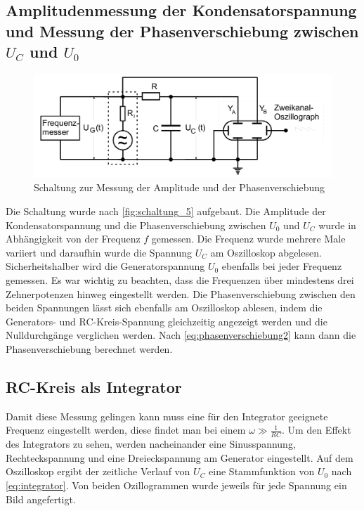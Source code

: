 \subsection{Amplitudenmessung der Kondensatorspannung und Messung der Phasenverschiebung zwischen $U_C$ und $U_0$}
\label{sec:Durchführung_2}

\begin{figure}
    \centering
    \includegraphics[width=\textwidth/2]{images/schaltung_5.png}
    \caption{Schaltung zur Messung der Amplitude und der Phasenverschiebung  \cite{V353}}
    \label{fig:schaltung_5}
\end{figure}

Die Schaltung wurde nach \autoref{fig:schaltung_5} aufgebaut. 
Die Amplitude der Kondensatorspannung und die Phasenverschiebung zwischen $U_0$ und $U_C$ wurde in Abhängigkeit von der Frequenz $f$ gemessen. 
Die Frequenz wurde mehrere Male variiert und daraufhin wurde die Spannung $U_C$ am Oszilloskop abgelesen.
Sicherheitshalber wird die Generatorspannung $U_0$ ebenfalls bei jeder Frequenz gemessen. 
Es war wichtig zu beachten, dass die Frequenzen über mindestens drei Zehnerpotenzen hinweg eingestellt werden. 
Die Phasenverschiebung zwischen den beiden Spannungen lässt sich ebenfalls am Oszilloskop ablesen, indem die Generators- und RC-Kreis-Spannung gleichzeitig angezeigt werden und die Nulldurchgänge verglichen werden.
Nach \autoref{eq:phasenverschiebung2} kann dann die Phasenverschiebung berechnet werden. 

\subsection{RC-Kreis als Integrator}
\label{sec:Durchführung_3}

Damit diese Messung gelingen kann muss eine für den Integrator geeignete Frequenz eingestellt werden, diese findet man bei einem $\omega \gg \frac{1}{RC}$. 
Um den Effekt des Integrators zu sehen, werden nacheinander eine Sinusspannung, Rechteckspannung und eine Dreieckspannung am Generator eingestellt. 
Auf dem Oszilloskop ergibt der zeitliche Verlauf von $U_C$ eine Stammfunktion von $U_0$ nach \autoref{eq:integrator}. Von beiden Ozillogrammen wurde jeweils für jede Spannung ein Bild angefertigt.